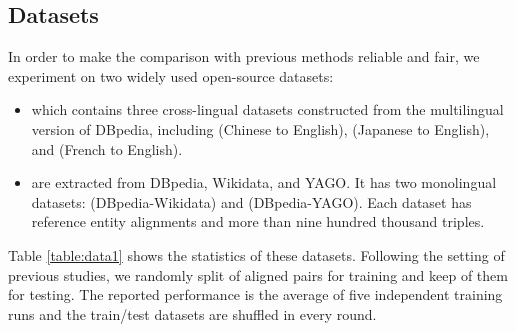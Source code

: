 \documentclass[sigconf,camera-ready]{acmart}
\begin{document}
\begin{table}[t]
\begin{center}
\end{center}
\caption{Statistical data of DBP15K and DWY100K.}\label{table:data1}
\end{table}

\subsection{Datasets}
In order to make the comparison with previous methods reliable and fair, we experiment on two widely used open-source datasets:
\begin{itemize}
  \item  \cite{DBLP:conf/semweb/SunHL17} which contains three cross-lingual datasets constructed from the multilingual version of DBpedia, including  (Chinese to English),  (Japanese to English), and  (French to English).
  \item  \cite{DBLP:conf/ijcai/SunHZQ18} are extracted from DBpedia, Wikidata, and YAGO. It has two monolingual datasets:  (DBpedia-Wikidata) and  (DBpedia-YAGO). Each dataset has  reference entity alignments and more than nine hundred thousand triples.
\end{itemize}
Table \ref{table:data1} shows the statistics of these datasets.
Following the setting of previous studies, we randomly split  of aligned pairs for training and keep  of them for testing.
The reported performance is the average of five independent training runs and the train/test datasets are shuffled in every round.
\end{document}
